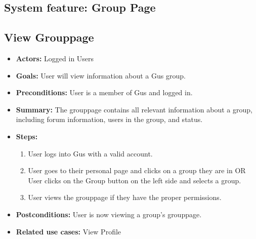 
\subsection{System feature: Group Page}
\subsection{View Grouppage}
  \begin{itemize}
          \item{\textbf{Actors:} Logged in Users}
          \item{\textbf{Goals:} User will view information about a Gus group.}
          \item{\textbf{Preconditions:} User is a member of Gus and logged in.}
          \item{\textbf{Summary:} The grouppage contains all relevant information about a group, including forum information, users in the group, and status. }
	  \item{\textbf{Steps:}}
	  \begin{enumerate}
	       \item{User logs into Gus with a valid account.}
	       \item{User goes to their personal page and clicks on a group they are in OR User clicks on the Group button on the left side and selects a group.}
	       \item{User views the grouppage if they have the proper permissions.}
	  \end{enumerate}
	  \item{\textbf{Postconditions:} User is now viewing a group's grouppage.}
	  \item{\textbf{Related use cases:} View Profile }
     \end{itemize}
